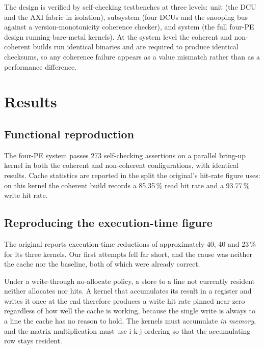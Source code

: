 \documentclass[conference]{IEEEtran}
\begin{document}
The design is verified by self-checking testbenches at three levels: unit
(the DCU and the AXI fabric in isolation), subsystem (four DCUs and the snooping
bus against a version-monotonicity coherence checker), and system (the full
four-PE design running bare-metal kernels). At the system level the coherent and
non-coherent builds run identical binaries and are required to produce identical
checksums, so any coherence failure appears as a value mismatch rather than as a
performance difference.

\section{Results}

\subsection{Functional reproduction}

The four-PE system passes 273 self-checking assertions on a parallel
bring-up kernel in both the coherent and non-coherent configurations, with
identical results. Cache statistics are reported in the split the original's
hit-rate figure uses: on this kernel the coherent build records a
85.35\,\% read hit rate and a 93.77\,\% write hit rate.

\subsection{Reproducing the execution-time figure}
\label{sec:fig6}

The original reports execution-time reductions of approximately 40, 40 and
23\,\% for its three kernels. Our first attempts fell far short, and the cause
was neither the cache nor the baseline, both of which were already correct.

Under a write-through no-allocate policy, a store to a line not currently
resident neither allocates nor hits. A kernel that accumulates its result in a
register and writes it once at the end therefore produces a write hit rate
pinned near zero regardless of how well the cache is working, because the single
write is always to a line the cache has no reason to hold. The kernels must
accumulate \emph{in memory}, and the matrix multiplication must use i-k-j
ordering so that the accumulating row stays resident.
\end{document}

